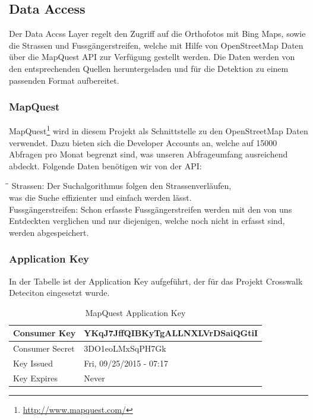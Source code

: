 \subsection{Data Access}
Der Data Accss Layer regelt den Zugriff auf die Orthofotos mit Bing Maps, sowie die Strassen und Fussgängerstreifen, welche mit Hilfe von OpenStreetMap Daten über die MapQuest API zur Verfügung gestellt werden. Die Daten werden von den entsprechenden Quellen heruntergeladen und für die Detektion zu einem passenden Format aufbereitet.

\subsubsection{MapQuest}
\Gls{MapQuest}\footnote{\url{http://www.mapquest.com/}} wird in diesem Projekt als Schnittstelle zu den OpenStreetMap Daten verwendet. Dazu bieten sich die Developer Accounts an, welche auf 15000 Abfragen pro Monat begrenzt sind, was unseren Abfrageumfang ausreichend abdeckt.
Folgende Daten benötigen wir von der API:
\begin{tabbing}[H]
    \hspace*{3cm}\=\hspace*{9cm}\= \kill
    Strassen: \> Der Suchalgorithmus folgen den Strassenverläufen, \\
     			\> was die Suche effizienter und einfach werden lässt.\\
    Fussgängerstreifen: \> Schon erfasste Fussgängerstreifen werden mit den von uns  \\ \> Entdeckten verglichen und nur diejenigen, welche noch nicht in erfasst sind,\\ \> werden abgespeichert.
\end{tabbing}


\subsubsection{Application Key}
In der Tabelle ist der Application Key aufgeführt, der für das Projekt Crosswalk Deteciton eingesetzt wurde.
\begin{table}[H]
	\begin{tabular}{ | p{6cm} | p{6cm}  | }
		\hline    
		Consumer Key &  YKqJ7JffQIBKyTgALLNXLVrDSaiQGtiI \\ \hline
		Consumer Secret & 3DO1eoLMxSqPH7Gk \\ \hline
		Key Issued & Fri, 09/25/2015 - 07:17 \\ \hline
		Key Expires & Never \\ \hline
	\end{tabular}
	\caption[MapQuest Application Key]{MapQuest Application Key}
\end{table}

